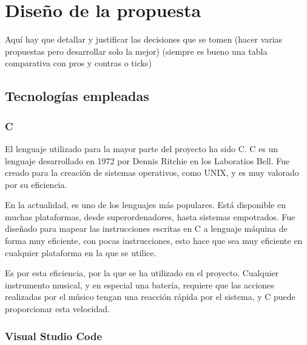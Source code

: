 
\chapter{Diseño de la propuesta} %
\label{cha:Diseno}

    Aquí hay que detallar y justificar las decisiones que se tomen (hacer varias propuestas pero desarrollar solo la
    mejor) (siempre es bueno una tabla comparativa con pros y contras o ticks)

    \section{Tecnologías empleadas} %
    \label{sec:TecnologiasEmpleadas}

        \subsection{C} %
        \label{sub:CLanguage}
        
            El lenguaje utilizado para la mayor parte del proyecto ha sido C. C es un lenguaje desarrollado en 1972 por
            Dennis Ritchie en los Laboratios Bell. Fue creado para la creación de sistemas operativos, como UNIX, y es
            muy valorado por su eficiencia.

            En la actualidad, es uno de los lenguajes más populares. Está disponible en muchas plataformas, desde
            superordenadores, hasta sistemas empotrados. Fue diseñado para mapear las instrucciones escritas en C a
            lenguaje máquina de forma muy eficiente, con pocas instrucciones, esto hace que sea muy eficiente en
            cualquier plataforma en la que se utilice.\cite{wikipedia_c_language}

            Es por esta eficiencia, por la que se ha utilizado en el proyecto. Cualquier instrumento musical, y en
            especial una batería, requiere que las acciones realizadas por el músico tengan una reacción rápida por el
            sistema, y C puede proporcionar esta velocidad.


        \subsection{Visual Studio Code} %
        \label{sub:VisualStudioCode}

